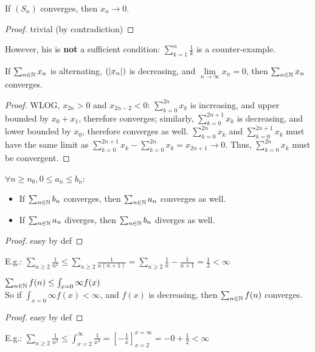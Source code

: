 \begin{property}
	If $(S_n)$ converges, then $x_n \to 0$.
\end{property}
\begin{proof}
	trivial (by contradiction)
\end{proof}
However, his is \textbf{not} a sufficient condition: $\sum_{k=1}^n \frac{1}{k}$ is a counter-example.

\begin{property}
	If $\sum_{n \in \mathbb{N}} x_n$ is alternating, $(| x_n |)$ is decreasing, and $\lim\limits_{n \to \infty} x_n = 0$, then $\sum_{n \in \mathbb{N}} x_n$ converges.
\end{property}
\begin{proof}
	WLOG, $x_{2n}>0$ and $x_{2n-2}<0$:
	$\sum_{k=0}^{2n} x_k$ is increasing, and upper bounded by $x_0+x_1$, therefore converges;
	similarly, $\sum_{k=0}^{2n+1} x_k$ is decreasing, and lower bounded by $x_0$, therefore converges as well.
	$\sum_{k=0}^{2n} x_k$ and $\sum_{k=0}^{2n+1} x_k$ must have the same limit as $\sum_{k=0}^{2n+1} x_k - \sum_{k=0}^{2n} x_k = x_{2n+1} \to 0$.
	Thus, $\sum_{k=0}^{2n} x_k$ must be convergent.
\end{proof}

\begin{property}
	$\forall n \geq n_0, 0 \leq a_n \leq b_n$:
	\begin{itemize}
		\item If $\sum_{n \in \mathbb{N}} b_n$ converges, then $\sum_{n \in \mathbb{N}} a_n$ converges as well.
		\item If $\sum_{n \in \mathbb{N}} a_n$ diverges, then $\sum_{n \in \mathbb{N}} b_n$ diverges as well.
	\end{itemize}
\end{property}
\begin{proof}
	easy by def
\end{proof}
E.g.: $\sum_{n \geq 2} \frac{1}{n^2}
\leq \sum_{n \geq 2} \frac{1}{n(n+1)}
= \sum_{n \geq 2} \frac{1}{n}-\frac{1}{n+1}
= \frac{1}{2} < \infty$

\begin{property}
	$\sum_{n \in \mathbb{N}} f(n) \leq \int_{x=0}{\infty} f(x)$\\
	So if $\int_{x=0}{\infty} f(x) < \infty$, and $f(x)$ is decreasing, then $\sum_{n \in \mathbb{N}} f(n)$ converges.
\end{property}
\begin{proof}
	easy by def
\end{proof}
E.g.: $\sum_{n \geq 2} \frac{1}{n^2}
\leq \int_{x = 2}^{\infty} \frac{1}{x^2}
= \left[ -\frac{1}{x} \right]_{x=2}^{x=\infty}
= -0 +\frac{1}{2} < \infty$



